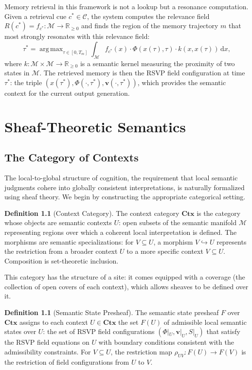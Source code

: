 \documentclass[12pt, a4paper, openany]{book}
\theoremstyle{plain}
\theoremstyle{definition}
\newtheorem{definition}[theorem]{Definition}
\theoremstyle{remark}
\newcommand{\vvec}{\mathbf{v}}
\newcommand{\Sfield}{S}
\DeclareMathOperator{\argmax}{arg\,max}
\begin{document}
Memory retrieval in this framework is not a lookup but a resonance computation. Given a retrieval cue $c^* \in \mathcal{C}$, the system computes the relevance field $R(c^*) = f_{c^*}: \mathcal{M} \to \mathbb{R}_{\geq 0}$ and finds the region of the memory trajectory $m$ that most strongly resonates with this relevance field:
\[
\tau^* = \argmax_{\tau \in [0, T_m]} \int_{\mathcal{M}} f_{c^*}(x) \cdot \Phi(x(\tau), \tau) \cdot k(x, x(\tau)) \, \mathrm{d}x,
\]
where $k: \mathcal{M} \times \mathcal{M} \to \mathbb{R}_{\geq 0}$ is a semantic kernel measuring the proximity of two states in $\mathcal{M}$. The retrieved memory is then the RSVP field configuration at time $\tau^*$: the triple $(x(\tau^*), \Phi(\cdot, \tau^*), \vvec(\cdot, \tau^*))$, which provides the semantic context for the current output generation.

\chapter{Sheaf-Theoretic Semantics}

\section{The Category of Contexts}

The local-to-global structure of cognition, the requirement that local semantic judgments cohere into globally consistent interpretations, is naturally formalized using sheaf theory. We begin by constructing the appropriate categorical setting.

\begin{definition}[Context Category]
The context category $\mathbf{Ctx}$ is the category whose objects are semantic contexts $U$: open subsets of the semantic manifold $\mathcal{M}$ representing regions over which a coherent local interpretation is defined. The morphisms are semantic specializations: for $V \subseteq U$, a morphism $V \hookrightarrow U$ represents the restriction from a broader context $U$ to a more specific context $V \subseteq U$. Composition is set-theoretic inclusion.
\end{definition}

This category has the structure of a site: it comes equipped with a coverage (the collection of open covers of each context), which allows sheaves to be defined over it.

\begin{definition}[Semantic State Presheaf]
The semantic state presheaf $F$ over $\mathbf{Ctx}$ assigns to each context $U \in \mathbf{Ctx}$ the set $F(U)$ of admissible local semantic states over $U$: the set of RSVP field configurations $(\Phi|_U, \vvec|_U, \Sfield|_U)$ that satisfy the RSVP field equations on $U$ with boundary conditions consistent with the admissibility constraints. For $V \subseteq U$, the restriction map $\rho_{UV}: F(U) \to F(V)$ is the restriction of field configurations from $U$ to $V$.
\end{definition}
\end{document}

